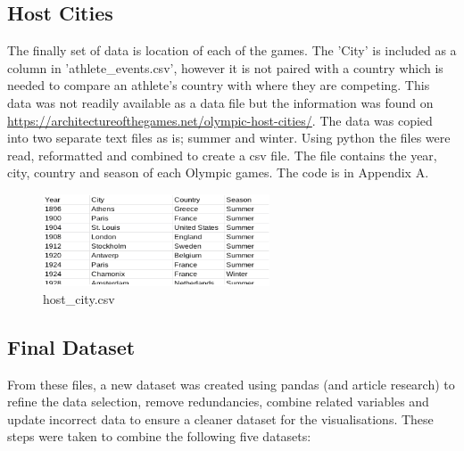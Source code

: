 \documentclass[a4 paper, 12pt]{article}
\begin{document}
    \subsection{Host Cities}
    The finally set of data is location of each of the games. The 'City' is included as a column in 'athlete\_events.csv', however it is not paired with a country which is needed to compare an athlete's country with where they are competing. This data was not readily available as a data file but the information was found on \url{https://architectureofthegames.net/olympic-host-cities/}. The data was copied into two separate text files as is; summer and winter. Using python the files were read, reformatted and combined to create a csv file. The file contains the year, city, country and season of each Olympic games. The code is in Appendix A. 
        \begin{figure} [H]
            \centering
            \includegraphics[width=0.6\textwidth, frame]
            {./images/host_data.png}  
            \caption{host\_city.csv}                  
        \end{figure}  

    \subsection{Final Dataset}
    From these files, a new dataset was created using pandas (and article research) to refine the data selection, remove redundancies, combine related variables and update incorrect data to ensure a cleaner dataset for the visualisations. These steps were taken to combine the following five datasets:
\end{document}
